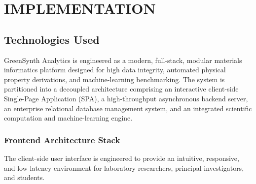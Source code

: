\documentclass[12pt,a4paper,oneside]{report}
\begin{document}
{{{\chapter{IMPLEMENTATION}

\section{Technologies Used}

GreenSynth Analytics is engineered as a modern, full-stack, modular materials informatics platform designed for high data integrity, automated physical property derivations, and machine-learning benchmarking. The system is partitioned into a decoupled architecture comprising an interactive client-side Single-Page Application (SPA), a high-throughput asynchronous backend server, an enterprise relational database management system, and an integrated scientific computation and machine-learning engine.

\subsection{Frontend Architecture Stack}

The client-side user interface is engineered to provide an intuitive, responsive, and low-latency environment for laboratory researchers, principal investigators, and students.

}}}
\end{document}
